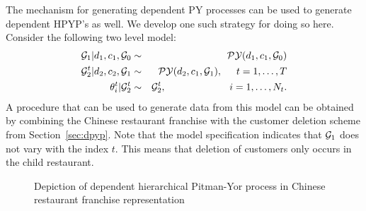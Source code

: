 The mechanism for generating dependent PY processes can be used to generate dependent HPYP's as well.  We develop one such strategy for doing so here.  Consider the following two level model: 
%
\begin{eqnarray}
\G_1 | d_1, c_1, \G_0 &\sim& \PY(d_1, c_1, \G_0)  \label{fig:dhpyp} \\
\G_2^t | d_2, c_2, \G_1&\sim& \PY(d_2, c_1, \G_1), \hspace{.5cm} t = 1,\dots, T \nonumber\\
 \theta^t_i | \G_2^t &\sim& \G_2^t ,\hspace{2.27cm} i = 1,\dots, N_t. \nonumber
\end{eqnarray}
%
A procedure that can be used to generate data from this model can be obtained by combining the Chinese restaurant franchise with the customer deletion scheme from Section~\ref{sec:dpyp}.  Note that the model specification indicates that $\G_1$ does not vary with the index $t$.  This means that deletion of customers only occurs in the child restaurant.

\begin{figure}[t] 
	\begin{center}
		\caption{Depiction of dependent hierarchical Pitman-Yor process in Chinese restaurant franchise representation}
		\label{figVHPY}
	\end{center} 
\end{figure} 


